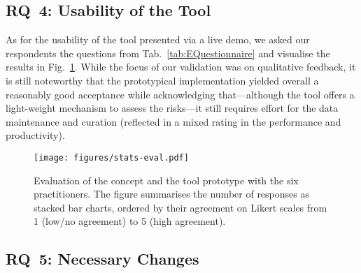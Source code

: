 \documentclass[lnbip]{svmultln}
\begin{document}
\subsection{RQ~4: Usability of the Tool}
As for the usability of the tool presented via a live demo, we asked our respondents the questions from Tab.~\ref{tab:EQuestionnaire} and visualise the results in Fig.~\ref{fig:StatsEvaluation}. While the focus of our validation was on qualitative feedback, it is still noteworthy that the prototypical implementation yielded overall a reasonably good acceptance while acknowledging that---although the tool offers a light-weight mechanism to assess the risks---it still requires effort for the data maintenance and curation (reflected in a mixed rating in the performance and productivity).
\begin{figure}[!hbtp]
\centering
  \texttt{[image: figures/stats-eval.pdf]}\\
  \caption{Evaluation of the concept and the tool prototype with the six practitioners. The figure summarises the number of responses as stacked bar charts, ordered by their agreement on Likert scales from 1 (low/no agreement) to 5 (high agreement).}
  \label{fig:StatsEvaluation}
\end{figure} 




\subsection{RQ~5: Necessary Changes}
\end{document}
